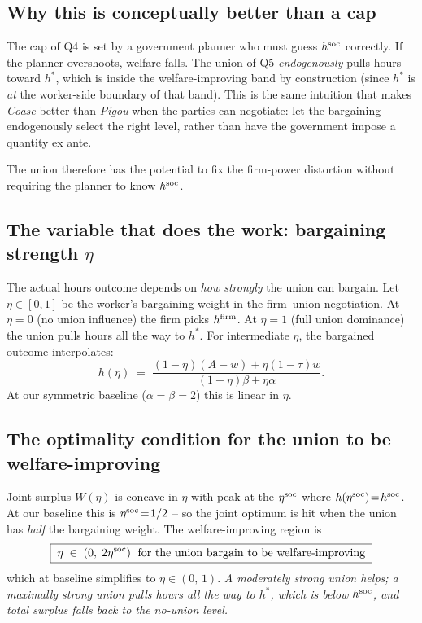 \documentclass[11pt,a4paper]{article}
\begin{document}
\subsection{Why this is conceptually better than a cap}

The cap of Q4 is set by a government planner who must guess
$h^{\rm soc}$ correctly. If the planner overshoots, welfare falls. The
union of Q5 \emph{endogenously} pulls hours toward $h^\ast$, which is
inside the welfare-improving band by construction (since $h^\ast$ is
\emph{at} the worker-side boundary of that band). This is the same
intuition that makes \emph{Coase} better than \emph{Pigou} when the
parties can negotiate: let the bargaining endogenously select the
right level, rather than have the government impose a quantity ex ante.

The union therefore has the potential to fix the firm-power distortion
without requiring the planner to know $h^{\rm soc}$.

\subsection{The variable that does the work: bargaining strength $\eta$}

The actual hours outcome depends on \emph{how strongly} the union can
bargain. Let $\eta\!\in\![0,1]$ be the worker's bargaining weight in
the firm--union negotiation. At $\eta\!=\!0$ (no union influence) the
firm picks $h^{\rm firm}$. At $\eta\!=\!1$ (full union dominance) the
union pulls hours all the way to $h^\ast$. For intermediate $\eta$, the
bargained outcome interpolates:
\[
h(\eta)\;=\;\frac{(1-\eta)(A-w) + \eta(1-\tau)w}{(1-\eta)\beta + \eta\alpha}.
\]
At our symmetric baseline ($\alpha\!=\!\beta\!=\!2$) this is linear in
$\eta$.

\subsection{The optimality condition for the union to be welfare-improving}

Joint surplus $W(\eta)$ is concave in $\eta$ with peak at the
$\eta^{\rm soc}$ where $h(\eta^{\rm soc})\!=\!h^{\rm soc}$. At our
baseline this is $\eta^{\rm soc}\!=\!1/2$ -- so the joint optimum is
hit when the union has \emph{half} the bargaining weight. The
welfare-improving region is
\[
\boxed{\;\eta\;\in\;(0,\;2\eta^{\rm soc})\;\text{ for the union bargain
to be welfare-improving}\;}
\]
which at baseline simplifies to $\eta\!\in\!(0,\,1)$. \emph{A
moderately strong union helps; a maximally strong union pulls hours
all the way to $h^\ast$, which is below $h^{\rm soc}$, and total
surplus falls back to the no-union level.}
\end{document}
